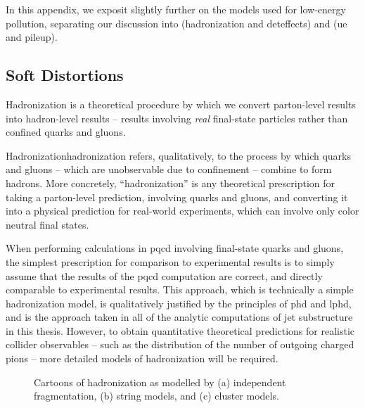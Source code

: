 \begin{subappendices}
In this appendix, we exposit slightly further on the models used for low-energy pollution, separating our discussion into  (\gls{hadronization} and \gls{deteffects}) and  (\gls{ue} and \gls{pileup}).

\subsection{Soft Distortions}
\label{app:soft-distortions}

Hadronization is a theoretical procedure by which we convert parton-level results into hadron-level results -- results involving \textit{real} final-state particles rather than confined quarks and gluons.

\begin{definitionbox}{Hadronization}{hadronization}
     refers, qualitatively, to the process by which quarks and gluons -- which are unobservable due to confinement -- combine to form hadrons.
    More concretely, ``hadronization'' is any theoretical prescription for taking a parton-level prediction, involving quarks and gluons, and converting it into a physical prediction for real-world experiments, which can involve only color neutral final states.
\end{definitionbox}


When performing calculations in \gls{pqcd} involving final-state quarks and gluons, the simplest prescription for comparison to experimental results is to simply assume that the results of the \gls{pqcd} computation are correct, and directly comparable to experimental results.
%
This approach, which is technically a simple hadronization model, is qualitatively justified by the principles of \gls{phd} and \gls{lphd}, and is the approach taken in all of the analytic computations of jet substructure in this thesis.
%
However, to obtain quantitative theoretical predictions for realistic collider observables -- such as the distribution of the number of outgoing charged pions -- more detailed models of hadronization will be required.



\begin{figure}[]
    \centering
    \caption[Cartoons of common hadronization models.]{
        Cartoons of hadronization as modelled by (a) independent fragmentation, (b) string models, and (c) cluster models.
    }
    \label{fig:cms-cartoon}
\end{figure}





\end{subappendices}
